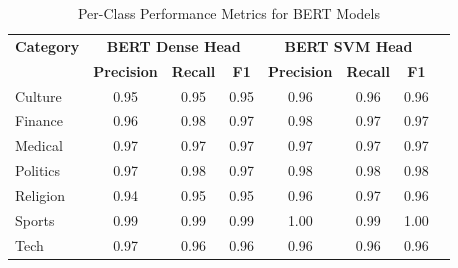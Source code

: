 \documentclass[sn-mathphys-num]{sn-jnl}
\begin{document}
\begin{table}[!ht]
\centering
\caption{Per-Class Performance Metrics for BERT Models}
\label{tab:per_class_performance}
\small
\begin{tabular}{lccccccc}
\hline
\textbf{Category} & \multicolumn{3}{c}{\textbf{BERT Dense Head}} & \multicolumn{3}{c}{\textbf{BERT SVM Head}} \\
 & \textbf{Precision} & \textbf{Recall} & \textbf{F1} & \textbf{Precision} & \textbf{Recall} & \textbf{F1} \\
\hline
Culture & 0.95 & 0.95 & 0.95 & 0.96 & 0.96 & 0.96 \\
Finance & 0.96 & 0.98 & 0.97 & 0.98 & 0.97 & 0.97 \\
Medical & 0.97 & 0.97 & 0.97 & 0.97 & 0.97 & 0.97 \\
Politics & 0.97 & 0.98 & 0.97 & 0.98 & 0.98 & 0.98 \\
Religion & 0.94 & 0.95 & 0.95 & 0.96 & 0.97 & 0.96 \\
Sports & 0.99 & 0.99 & 0.99 & 1.00 & 0.99 & 1.00 \\
Tech & 0.97 & 0.96 & 0.96 & 0.96 & 0.96 & 0.96 \\
\hline
\end{tabular}
\end{table}
\end{document}
